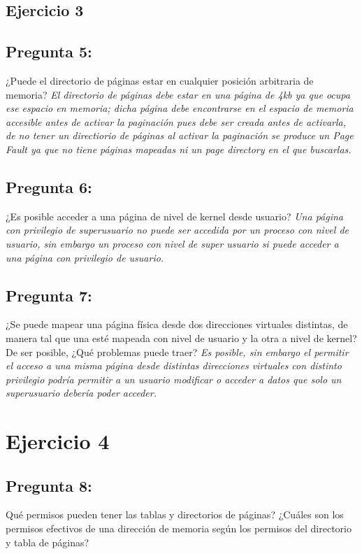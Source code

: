 \documentclass[10pt, a4paper]{article}
\begin{document}
\subsection{Ejercicio 3}
{\subsection{Pregunta 5:}} ¿Puede el directorio de páginas estar en cualquier posición arbitraria de memoria?\newline
\textit{
	El directorio de p\'aginas debe estar en una p\'agina de 4kb ya que ocupa ese espacio en memoria; dicha p\'agina debe encontrarse en el espacio de memoria accesible antes de activar la paginaci\'on pues debe ser creada antes de activarla, de no tener un directiorio de p\'aginas al activar la paginaci\'on se produce un Page Fault ya que no tiene p\'aginas mapeadas ni un page directory en el que buscarlas.
}
{\subsection{Pregunta 6:}} ¿Es posible acceder a una página de nivel de kernel desde usuario?\newline
\textit{
	Una p\'agina con privilegio de superusuario no puede ser accedida por un proceso con nivel de usuario, sin embargo un proceso con nivel de super usuario si puede acceder a una p\'agina con privilegio de usuario.
}

{\subsection{Pregunta 7:}} ¿Se puede mapear una página física desde dos direcciones virtuales
distintas, de manera tal que una esté mapeada con nivel de usuario y la otra a nivel de kernel? De ser posible, ¿Qué problemas puede traer?\newline
\textit{
	Es posible, sin embargo el permitir el acceso a una misma p\'agina desde distintas direcciones virtuales con distinto privilegio podr\'ia permitir a un usuario modificar o acceder a datos que solo un superusuario deber\'ia poder acceder.
}

\section{Ejercicio 4}
{\subsection{Pregunta 8:}} Qué permisos pueden tener las tablas y directorios de páginas? ¿Cuáles son los permisos efectivos de una dirección de memoria según los permisos del directorio
y tabla de páginas?
\end{document}
